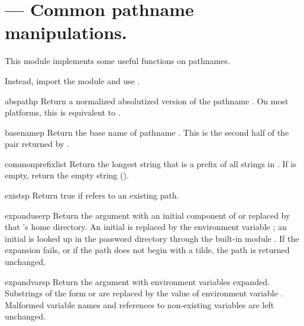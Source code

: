 \section{ ---
         Common \POSIX{} pathname manipulations.}


This module implements some useful functions on \POSIX{} pathnames.

  Instead, import the
module  and use .


\begin{funcdesc}{abspath}{p}
Return a normalized absolutized version of the pathname .  On
most platforms, this is equivalent to
.
\end{funcdesc}

\begin{funcdesc}{basename}{p}
Return the base name of pathname
.
This is the second half of the pair returned by
.
\end{funcdesc}

\begin{funcdesc}{commonprefix}{list}
Return the longest string that is a prefix of all strings in
.
If
is empty, return the empty string ().
\end{funcdesc}

\begin{funcdesc}{exists}{p}
Return true if
refers to an existing path.
\end{funcdesc}

\begin{funcdesc}{expanduser}{p}
Return the argument with an initial component of \samp{\~} or
 replaced by that 's home directory.  An
initial \samp{\~{}} is replaced by the environment variable
; an initial  is looked up in the
password directory through the built-in module
.  If the expansion fails, or if the
path does not begin with a tilde, the path is returned unchanged.
\end{funcdesc}

\begin{funcdesc}{expandvars}{p}
Return the argument with environment variables expanded.  Substrings
of the form  or  are
replaced by the value of environment variable .  Malformed
variable names and references to non-existing variables are left
unchanged.
\end{funcdesc}


